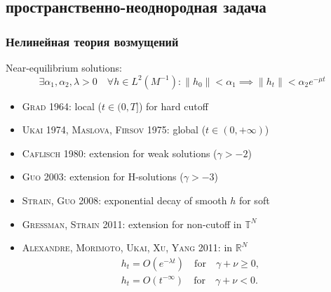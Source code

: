 \documentclass[mathserif]{beamer} %
\newcommand{\OO}[1]{O(#1)}
\newcommand{\Cite}[2][]{\alert{\textsc{#2 #1}}}
\begin{document}
\subsection{пространственно-неоднородная задача}

\begin{frame}
    \frametitle{Нелинейная теория возмущений}
    Near-equilibrium solutions:
    \[ \exists \alpha_1, \alpha_2, \lambda > 0 \quad \forall h\in L^2(M^{-1}):
        \|h_0\|<\alpha_1 \implies \|h_t\|<\alpha_2 e^{-\mu t}  \] \vspace{-10pt}
    \begin{itemize}
        \item \Cite[1964]{Grad}: local (\(t\in(0,T]\)) for hard cutoff
        \item \Cite[1974]{Ukai}, \Cite[1975]{Maslova, Firsov}: global (\(t\in(0,+\infty)\))
        \item \Cite[1980]{Caflisch}: extension for weak solutions (\(\gamma>-2\))
        \item \Cite[2003]{Guo}: extension for H-solutions (\(\gamma>-3\))
        \item \Cite[2008]{Strain, Guo}: exponential decay of smooth \(h\) for soft
        \item \Cite[2011]{Gressman, Strain}: extension for non-cutoff in \(\mathbb{T}^N\)
        \item \Cite[2011]{Alexandre, Morimoto, Ukai, Xu, Yang}: in \(\mathbb{R}^N\)
        \begin{gather*}
            h_t = \OO{e^{-\lambda t}} \quad\text{for}\quad \gamma+\nu \geq0, \\
            h_t =\OO{t^{-\infty}} \quad\text{for}\quad \gamma+\nu <0.
        \end{gather*}
    \end{itemize}
\end{frame}
\end{document}
